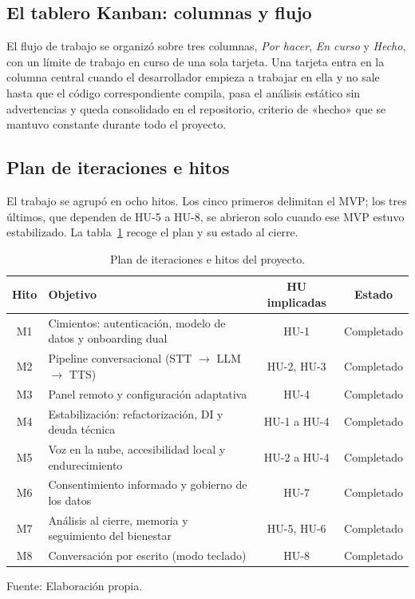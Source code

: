 \subsection{El tablero Kanban: columnas y flujo}
\label{sec:tablero}


El flujo de trabajo se organizó sobre tres columnas, \textit{Por hacer}, \textit{En curso} y
\textit{Hecho}, con un límite de trabajo en curso de una sola tarjeta. Una tarjeta entra en la columna
central cuando el desarrollador empieza a trabajar en ella y no sale hasta que el código correspondiente
compila, pasa el análisis estático sin advertencias y queda consolidado en el repositorio, criterio de
«hecho» que se mantuvo constante durante todo el proyecto.

\subsection{Plan de iteraciones e hitos}

El trabajo se agrupó en ocho hitos. Los cinco primeros delimitan el MVP; los tres últimos, que dependen de
HU-5 a HU-8, se abrieron solo cuando ese MVP estuvo estabilizado. La tabla~\ref{tab:plan-hitos} recoge el plan y su estado al cierre.

\begin{table}[htbp]
    \centering
    \caption{Plan de iteraciones e hitos del proyecto.}
    \label{tab:plan-hitos}
    \begin{tabularx}{\textwidth}{@{}c >{\RaggedRight\arraybackslash}X c c@{}}
        \toprule
        \textbf{Hito} & \textbf{Objetivo} & \textbf{HU implicadas} & \textbf{Estado} \\
        \midrule
        M1 & Cimientos: autenticación, modelo de datos y onboarding dual & HU-1        & Completado \\
        M2 & Pipeline conversacional (STT $\rightarrow$ LLM $\rightarrow$ TTS) & HU-2, HU-3 & Completado \\
        M3 & Panel remoto y configuración adaptativa              & HU-4        & Completado \\
        M4 & Estabilización: refactorización, DI y deuda técnica   & HU-1 a HU-4 & Completado \\
        M5 & Voz en la nube, accesibilidad local y endurecimiento  & HU-2 a HU-4 & Completado \\
        M6 & Consentimiento informado y gobierno de los datos     & HU-7        & Completado \\
        M7 & Análisis al cierre, memoria y seguimiento del bienestar & HU-5, HU-6 & Completado \\
        M8 & Conversación por escrito (modo teclado)              & HU-8        & Completado \\
        \bottomrule
    \end{tabularx}

    \vspace{2pt}
    {\footnotesize Fuente: Elaboración propia.}
\end{table}

